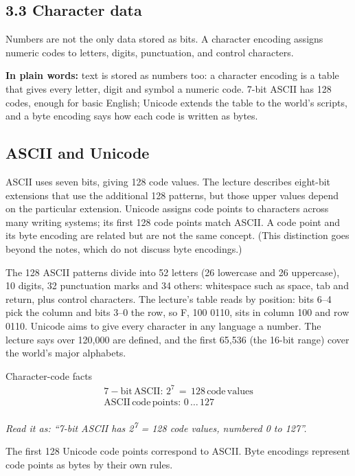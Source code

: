 \documentclass[11pt]{article}
\begin{document}
\begin{keepsection}
\section{3.3 Character data}

Numbers are not the only data stored as bits. A character encoding assigns numeric codes to letters, digits, punctuation, and control characters.

\begin{plainbox}\textbf{In plain words:} text is stored as numbers too: a character encoding is a table that gives every letter, digit and symbol a numeric code. 7-bit ASCII has 128 codes, enough for basic English; Unicode extends the table to the world’s scripts, and a byte encoding says how each code is written as bytes.\end{plainbox}

\begin{keepsection}
\subsection{ASCII and Unicode}

ASCII uses seven bits, giving 128 code values. The lecture describes eight-bit extensions that use the additional 128 patterns, but those upper values depend on the particular extension. Unicode assigns code points to characters across many writing systems; its first 128 code points match ASCII. A code point and its byte encoding are related but are not the same concept. (This distinction goes beyond the notes, which do not discuss byte encodings.)

The 128 ASCII patterns divide into 52 letters (26 lowercase and 26 uppercase), 10 digits, 32 punctuation marks and 34 others: whitespace such as space, tab and return, plus control characters. The lecture’s table reads by position: bits 6–4 pick the column and bits 3–0 the row, so F, 100 0110, sits in column 100 and row 0110. Unicode aims to give every character in any language a number. The lecture says over 120,000 are defined, and the first 65,536 (the 16-bit range) cover the world’s major alphabets.

\begin{equationcard}{Character-code facts}
\[ \begin{gathered} 7-\text{bit}\, \text{ASCII}:\, 2^{7}\, =\, 128\, \text{code}\, \text{values} \\ \text{ASCII}\, \text{code}\, \text{points}:\, 0\, …\, 127 \end{gathered} \]
{\small \emph{Read it as: “7-bit ASCII has 2\textsuperscript{7} = 128 code values, numbered 0 to 127”.}\par The first 128 Unicode code points correspond to ASCII. Byte encodings represent code points as bytes by their own rules.}
\end{equationcard}


\end{keepsection}
\end{keepsection}
\end{document}
